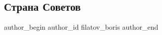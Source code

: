  
 
 
 
 
 
\subsection{Страна Советов}
\label{sec:06_11_2021.fb.filatov_boris.1.strana_sovetov}
 
\ifcmt
 author_begin
   author_id filatov_boris
 author_end
\fi

